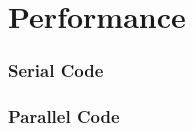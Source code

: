 \section{Performance}
\begin{frame}
	\frametitle{Serial Code}
\end{frame}

\begin{frame}
	\frametitle{Parallel Code}
\end{frame}